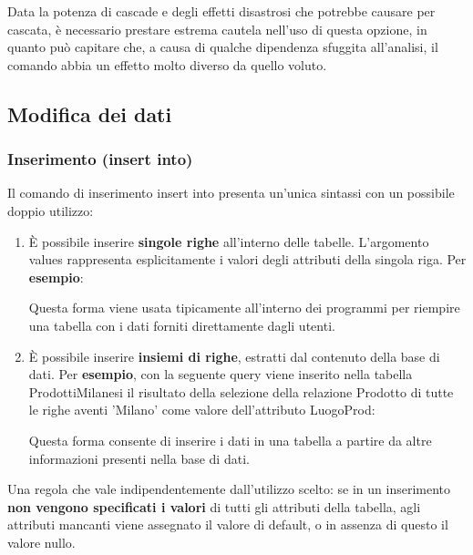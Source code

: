 \documentclass[a4paper]{article}
\begin{document}
	Data la potenza di \textsf{cascade} e degli effetti disastrosi che potrebbe causare per cascata, è necessario prestare estrema cautela nell'uso di questa opzione, in quanto può capitare che, a causa di qualche dipendenza sfuggita all'analisi, il comando abbia un effetto molto diverso da quello voluto.\newpage
	
	\subsection{Modifica dei dati}
	
	\subsubsection{Inserimento (\textsf{insert into})}
	
	Il comando di inserimento \textsf{insert into} presenta un'unica sintassi con un possibile doppio utilizzo:
	
	\begin{enumerate}
		\item È possibile inserire \textbf{singole righe} all'interno delle tabelle. L'argomento \textsf{values} rappresenta esplicitamente i valori degli attributi della singola riga.\newline
		Per \textcolor{Green4}{\textbf{esempio}}:
		
		Questa forma viene usata tipicamente all'interno dei programmi per riempire una tabella con i dati forniti direttamente dagli utenti.
		
		\item È possibile inserire \textbf{insiemi di righe}, estratti dal contenuto della base di dati.\newline
		Per \textcolor{Green4}{\textbf{esempio}}, con la seguente query viene inserito nella tabella ProdottiMilanesi il risultato della selezione della relazione Prodotto di tutte le righe aventi \textsf{'Milano'} come valore dell'attributo \textsf{LuogoProd}:
		
		Questa forma consente di inserire i dati in una tabella a partire da altre informazioni presenti nella base di dati.
	\end{enumerate}
	Una regola che vale indipendentemente dall'utilizzo scelto: se in un inserimento \textbf{non vengono specificati i valori} di tutti gli attributi della tabella, agli attributi mancanti viene assegnato il valore di default, o in assenza di questo il valore nullo.\newline
	
\end{document}
